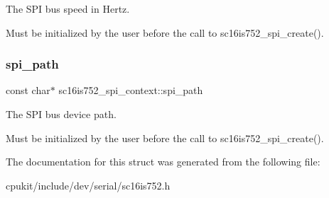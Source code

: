 The S\+PI bus speed in Hertz. 

Must be initialized by the user before the call to sc16is752\+\_\+spi\+\_\+create(). \mbox{\label{structsc16is752__spi__context_a02663178c14e331d10f19e0d01e40d3f}} 
\subsubsection{\texorpdfstring{spi\_path}{spi\_path}}
{\footnotesize\ttfamily const char$\ast$ sc16is752\+\_\+spi\+\_\+context\+::spi\+\_\+path}



The S\+PI bus device path. 

Must be initialized by the user before the call to sc16is752\+\_\+spi\+\_\+create(). 

The documentation for this struct was generated from the following file\+:\begin{DoxyCompactItemize}
\item 
cpukit/include/dev/serial/sc16is752.\+h\end{DoxyCompactItemize}
